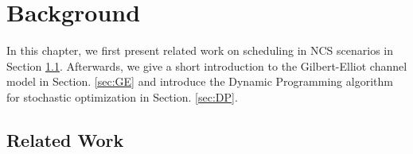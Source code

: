 \chapter{Background}


In this chapter, we first present related work on scheduling in NCS scenarios in
Section \ref{sec:survey}. Afterwards, we give a short introduction to the
Gilbert-Elliot channel model in Section. \ref{sec:GE} and introduce the Dynamic
Programming algorithm for stochastic optimization in Section. \ref{sec:DP}.

\section{Related Work} \label{sec:survey}

